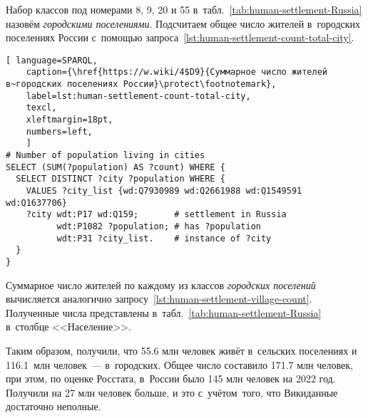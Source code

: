 Набор классов под номерами 8, 9, 20 и 55 в~табл.~\ref{tab:human-settlement-Russia} 
назовём \emph{городскими поселениями}. 
Подсчитаем общее число жителей в~городских поселениях России 
с~помощью запроса~\ref{lst:human-settlement-count-total-city}. 


\begin{lstlisting}[ language=SPARQL, 
    caption={\href{https://w.wiki/4$D9}{Суммарное число жителей в~городских поселениях России}\protect\footnotemark},
    label=lst:human-settlement-count-total-city,
    texcl,
    xleftmargin=18pt, 
    numbers=left,
    ]
# Number of population living in cities
SELECT (SUM(?population) AS ?count) WHERE {  
  SELECT DISTINCT ?city ?population WHERE {  
    VALUES ?city_list {wd:Q7930989 wd:Q2661988 wd:Q1549591 wd:Q1637706}
    ?city wdt:P17 wd:Q159;       # settlement in Russia
          wdt:P1082 ?population; # has ?population
          wdt:P31 ?city_list.    # instance of ?city
  }
}
\end{lstlisting}%

Суммарное число жителей по каждому из классов \emph{городских поселений} 
вычисляется аналогично запросу~\ref{lst:human-settlement-village-count}. 
Полученные числа представлены в~табл.~\ref{tab:human-settlement-Russia} в~столбце <<Население>>. 

Таким образом, получили, что \num{55.6} млн человек живёт в~сельских поселениях и \num{116.1}~млн человек~--- в~городских. 
Общее число составило \num{171.7} млн человек, 
при этом, по оценке Росстата, в~России было 145 млн человек на 2022 год. 
Получили на 27 млн человек больше, и это с~учётом~того, что Викиданные достаточно неполные. 

